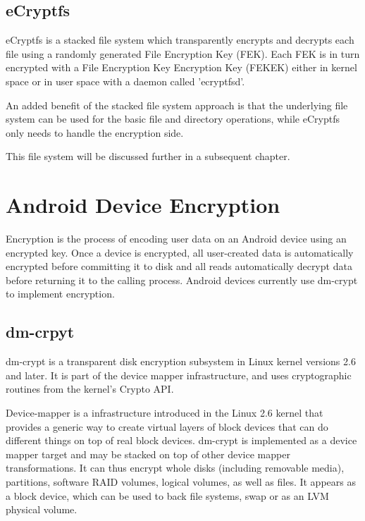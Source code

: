 \subsection{eCryptfs}
\label{sub-sec:sa-ecryptfs}

eCryptfs is a stacked file system which transparently encrypts and decrypts each file using a randomly generated File Encryption Key (FEK). Each FEK is in turn encrypted with a File Encryption Key Encryption Key (FEKEK) either in kernel space or in user space with a daemon called 'ecryptfsd'.

An added benefit of the stacked file system approach is that the underlying file system can be used for the basic file and directory operations, while eCryptfs only needs to handle the encryption side.

This file system will be discussed further in a subsequent chapter.

\section{Android Device Encryption}
\label{sec:and-dev-enc}

Encryption is the process of encoding user data on an Android device using an encrypted key. Once a device is encrypted, all user-created data is automatically encrypted before committing it to disk and all reads automatically decrypt data before returning it to the calling process.
Android devices currently use dm-crypt to implement encryption.

\subsection{dm-crpyt}
\label{sub-sec:dm-crypt}

dm-crypt is a transparent disk encryption subsystem in Linux kernel versions 2.6 and later. It is part of the device mapper infrastructure, and uses cryptographic routines from the kernel's Crypto API.

Device-mapper is a infrastructure introduced in the Linux 2.6 kernel that provides a generic way to create virtual layers of block devices that can do different things on top of real block devices.
dm-crypt is implemented as a device mapper target and may be stacked on top of other device mapper transformations. It can thus encrypt whole disks (including removable media), partitions, software RAID volumes, logical volumes, as well as files. It appears as a block device, which can be used to back file systems, swap or as an LVM physical volume.


